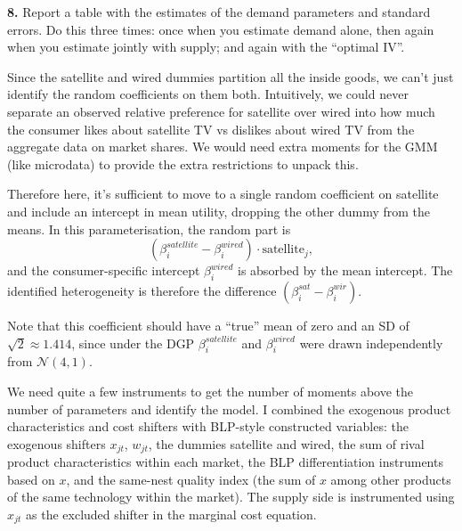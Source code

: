 \documentclass{article}
\begin{document}
\begin{tcolorbox}
\textbf{8.} Report a table with the estimates of the demand
parameters and standard errors. Do this three times: once when you estimate demand
alone, then again when you estimate jointly with supply; and again with the ``optimal IV''.
\end{tcolorbox}

Since the satellite and wired dummies partition all the inside goods, we can't just identify the random coefficients on them both. Intuitively, we could never separate an observed relative preference for satellite over wired into how much the consumer likes about satellite TV vs dislikes about wired TV from the aggregate data on market shares. We would need extra moments for the GMM (like microdata) to provide the extra restrictions to unpack this.

\vspace{5mm}

Therefore here, it's sufficient to move to a single random coefficient on satellite and include an intercept in mean utility, dropping the other dummy from the means. In this parameterisation, the random part is
\[
(\beta_i^{satellite} - \beta_i^{wired}) \cdot \text{satellite}_j,
\]
and the consumer-specific intercept $\beta_i^{wired}$ is absorbed by the mean intercept. The identified heterogeneity is therefore the difference $(\beta_i^{sat} - \beta_i^{wir})$.

\vspace{5mm}

Note that this coefficient should have a ``true'' mean of zero and an SD of $\sqrt{2} \approx 1.414$, since under the DGP $\beta_i^{satellite}$ and $\beta_i^{wired}$ were drawn independently from $\mathcal{N}(4,1)$.

\vspace{5mm}

We need quite a few instruments to get the number of moments above the number of parameters and identify the model. I combined the exogenous product characteristics and cost shifters with BLP-style constructed variables: the exogenous shifters $x_{jt}$, $w_{jt}$, the dummies satellite and wired, the sum of rival product characteristics within each market, the BLP differentiation instruments based on $x$, and the same-nest quality index (the sum of $x$ among other products of the same technology within the market).  The supply side is instrumented using $x_{jt}$ as the excluded shifter in the marginal cost equation.
\end{document}

